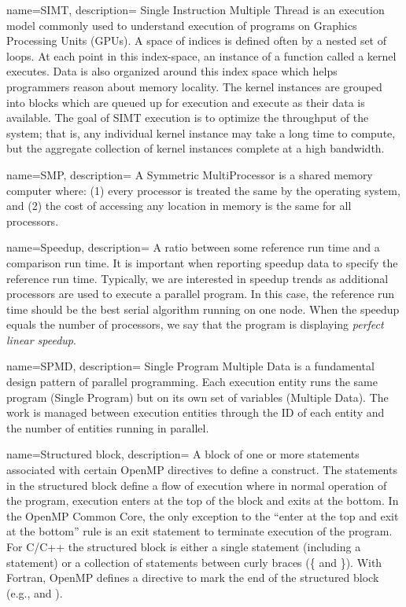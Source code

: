 {
   name={SIMT},
   description={
   Single Instruction Multiple Thread is an execution model commonly used to understand 
   execution of programs on Graphics Processing Units (GPUs).  A space of indices is defined
   often by a nested set of loops.
   At each point in this index-space, an instance of a function called a kernel executes.  Data is
   also organized around this index space which helps programmers reason about memory locality.  
   The kernel instances are grouped into blocks which are queued up for execution 
   and execute as their data is available.    The goal of SIMT execution is to optimize the throughput 
   of the system; that is, any individual kernel instance may take a long time to compute, but the aggregate
   collection of kernel instances complete at a high bandwidth.   
   }
}   

{
   name={SMP},
   description={
   A Symmetric MultiProcessor is a shared memory computer where: (1) every processor is treated
   the same by the operating system, and (2) the cost of accessing any location in memory is the 
   same for all processors.
   }
}   

{
   name={Speedup},
   description={
   A ratio between some reference run time and a comparison run time.  It is important when reporting
   speedup data to specify the reference run time.   Typically, we are interested
   in  speedup trends as additional processors are used to execute a parallel program.  In this case, the reference
   run time should  be the best serial algorithm running on one node.  When the speedup equals the number
   of processors, we say that the program is displaying \emph{perfect linear speedup}.   }
}   


{
   name={SPMD},
   description={
   Single Program Multiple Data is a fundamental design pattern of parallel programming.  Each execution
   entity runs the same program (Single Program) but on its own set of variables (Multiple Data).  The
   work is managed between execution entities through the ID of each entity and the number of entities
   running in parallel.
   }
} 

{
   name={Structured block},
   description={
  A block of one or more statements associated with certain OpenMP directives to define  a construct.
  The statements in the structured block define a flow of execution where in normal operation of the program,
  execution enters at the top of the block and exits at the bottom.  In the OpenMP Common Core, the only exception to
  the ``enter at the top and exit at the bottom'' rule is an exit statement to terminate execution of the program.   For C/C++
  the structured block is either a single statement (including a  statement) or a collection of statements
  between curly braces (\{ and \}).  With Fortran, OpenMP defines a directive to mark the end of the structured
  block (e.g.,  and ).  }
} 

